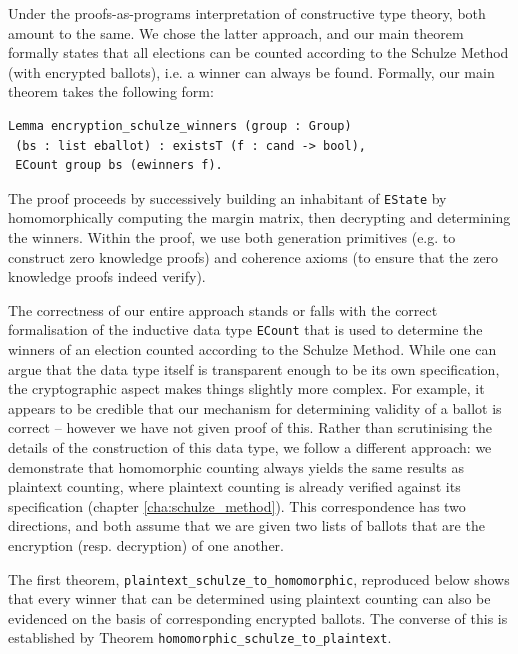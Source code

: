 \noindent
Under the proofs-as-programs interpretation of constructive type
theory, both amount to the same. We chose the latter approach, and
our main theorem formally states that all elections can be
counted according to the Schulze Method (with encrypted ballots),
i.e. a winner can always be found. Formally, our main theorem takes
the following form:
\begin{lstlisting}[frame=single,basicstyle=\ttfamily\footnotesize]
Lemma encryption_schulze_winners (group : Group) 
 (bs : list eballot) : existsT (f : cand -> bool), 
 ECount group bs (ewinners f).
\end{lstlisting}

\noindent
The proof proceeds by successively building an inhabitant of
\texttt{EState} by homomorphically computing the margin matrix, then
decrypting and determining the winners. Within the proof, we use
both generation primitives (e.g. to construct zero knowledge proofs)
and coherence axioms (to ensure that the zero knowledge proofs
indeed verify). 

The correctness of our entire approach stands or falls with the
correct formalisation of the inductive data type \texttt{ECount}
that is used to determine the winners of an election counted
according to the Schulze Method. While one can argue that the data
type itself is transparent enough to be its own specification,
the cryptographic aspect makes things slightly more complex. For
example, it appears to be credible that our mechanism for
determining validity of a ballot is correct -- however we have not
given proof of this. Rather than scrutinising the details of the
construction of this data type, we follow a different approach: we
demonstrate that homomorphic counting always yields the same results
as plaintext counting, where plaintext counting is already verified
against its specification (chapter \ref{cha:schulze_method}). 
This correspondence has two directions, and both assume that we are given
two lists of ballots that are the encryption (resp. decryption) of
one another. 


The first theorem, \texttt{plaintext\_schulze\_to\_homomorphic}, reproduced below shows
that every winner that can be determined using plaintext counting
can also be evidenced on the basis of corresponding encrypted ballots. The
converse of this is established by 
Theorem \texttt{homomorphic\_schulze\_to\_plaintext}.

